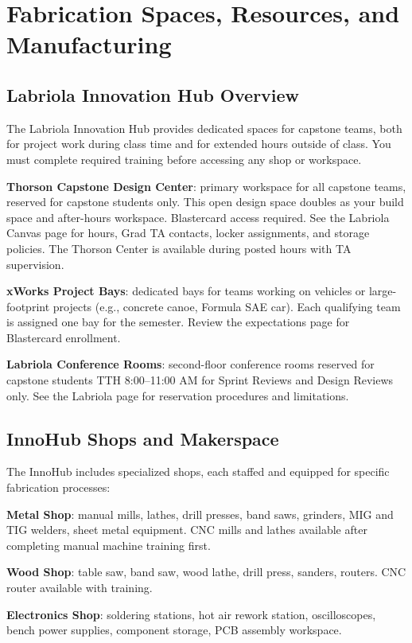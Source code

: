 \chapter{Fabrication Spaces, Resources, and Manufacturing}

\section{Labriola Innovation Hub Overview}
The Labriola Innovation Hub provides dedicated spaces for capstone teams, both for project work during class time and for extended hours outside of class. You must complete required training before accessing any shop or workspace.

\textbf{Thorson Capstone Design Center}: primary workspace for all capstone teams, reserved for capstone students only. This open design space doubles as your build space and after-hours workspace. Blastercard access required. See the Labriola Canvas page for hours, Grad TA contacts, locker assignments, and storage policies. The Thorson Center is available during posted hours with TA supervision.

\textbf{xWorks Project Bays}: dedicated bays for teams working on vehicles or large-footprint projects (e.g., concrete canoe, Formula SAE car). Each qualifying team is assigned one bay for the semester. Review the expectations page for Blastercard enrollment.

\textbf{Labriola Conference Rooms}: second-floor conference rooms reserved for capstone students TTH 8:00--11:00 AM for Sprint Reviews and Design Reviews only. See the Labriola page for reservation procedures and limitations.

\section{InnoHub Shops and Makerspace}
The InnoHub includes specialized shops, each staffed and equipped for specific fabrication processes:

\textbf{Metal Shop}: manual mills, lathes, drill presses, band saws, grinders, MIG and TIG welders, sheet metal equipment. CNC mills and lathes available after completing manual machine training first.

\textbf{Wood Shop}: table saw, band saw, wood lathe, drill press, sanders, routers. CNC router available with training.

\textbf{Electronics Shop}: soldering stations, hot air rework station, oscilloscopes, bench power supplies, component storage, PCB assembly workspace.

